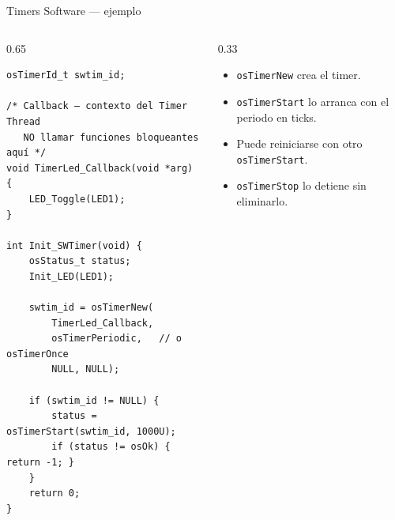 \begin{frame}[fragile]{Timers Software — ejemplo}
    \begin{columns}
        \begin{column}{0.65\textwidth}
            \begin{verbatim}
osTimerId_t swtim_id;

/* Callback — contexto del Timer Thread
   NO llamar funciones bloqueantes aquí */
void TimerLed_Callback(void *arg) {
    LED_Toggle(LED1);
}

int Init_SWTimer(void) {
    osStatus_t status;
    Init_LED(LED1);

    swtim_id = osTimerNew(
        TimerLed_Callback,
        osTimerPeriodic,   // o osTimerOnce
        NULL, NULL);

    if (swtim_id != NULL) {
        status = osTimerStart(swtim_id, 1000U);
        if (status != osOk) { return -1; }
    }
    return 0;
}
            \end{verbatim}
        \end{column}
        \begin{column}{0.33\textwidth}
            \begin{itemize}
                \item \texttt{osTimerNew} crea el timer.
                \item \texttt{osTimerStart} lo arranca con
                      el periodo en ticks.
                \item Puede reiniciarse con otro
                      \texttt{osTimerStart}.
                \item \texttt{osTimerStop} lo detiene
                      sin eliminarlo.
            \end{itemize}
        \end{column}
    \end{columns}
\end{frame}

